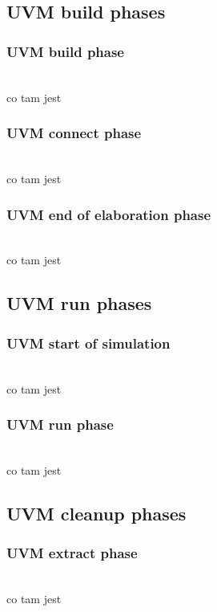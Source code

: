 \documentclass[11pt,a4paper]{article}
\begin{document}
	\subsection{UVM build phases}
	
		\subsubsection{UVM build phase}
		\hspace{5mm}
			\\co tam jest
			
		\subsubsection{UVM connect phase}
		\hspace{5mm}
			\\co tam jest
	
		\subsubsection{UVM end of elaboration phase}
		\hspace{5mm}
			\\co tam jest	
	
	\subsection{UVM run phases}

		\subsubsection{UVM start of simulation}
		\hspace{5mm}
			\\co tam jest	

		\subsubsection{UVM run phase}
		\hspace{5mm}
			\\co tam jest	

	\subsection{UVM cleanup phases}

		\subsubsection{UVM extract phase}
		\hspace{5mm}
			\\co tam jest	
			
\end{document}
